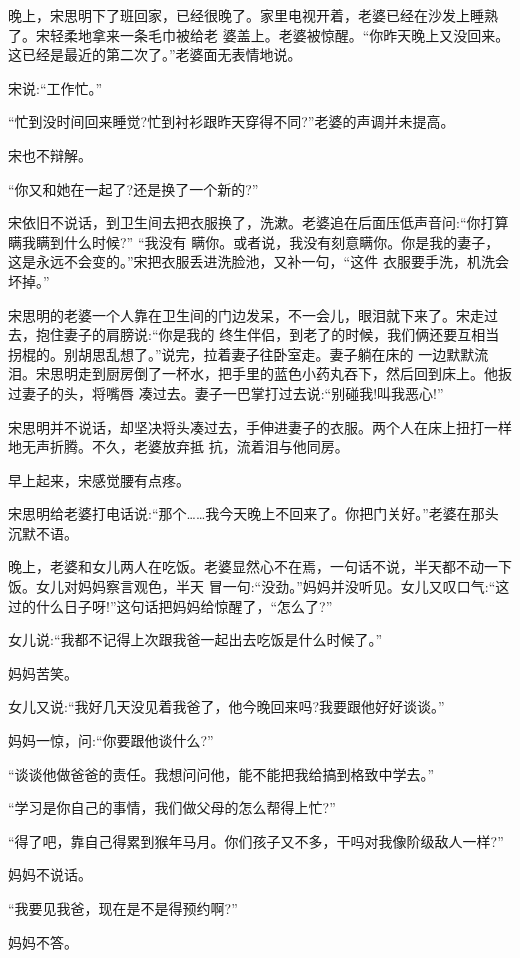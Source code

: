 \documentclass[11pt,a4paper,onecolumn]{article}
\begin{document}
晚上，宋思明下了班回家，已经很晚了。家里电视开着，老婆已经在沙发上睡熟了。宋轻柔地拿来一条毛巾被给老
婆盖上。老婆被惊醒。``你昨天晚上又没回来。这已经是最近的第二次了。''老婆面无表情地说。

宋说:``工作忙。''

``忙到没时间回来睡觉?忙到衬衫跟昨天穿得不同?''老婆的声调并未提高。

宋也不辩解。

``你又和她在一起了?还是换了一个新的?''

宋依旧不说话，到卫生间去把衣服换了，洗漱。老婆追在后面压低声音问:``你打算瞒我瞒到什么时候?'' ``我没有
瞒你。或者说，我没有刻意瞒你。你是我的妻子，这是永远不会变的。''宋把衣服丢进洗脸池，又补一句，``这件
衣服要手洗，机洗会坏掉。''

宋思明的老婆一个人靠在卫生间的门边发呆，不一会儿，眼泪就下来了。宋走过去，抱住妻子的肩膀说:``你是我的
终生伴侣，到老了的时候，我们俩还要互相当拐棍的。别胡思乱想了。''说完，拉着妻子往卧室走。妻子躺在床的
一边默默流泪。宋思明走到厨房倒了一杯水，把手里的蓝色小药丸吞下，然后回到床上。他扳过妻子的头，将嘴唇
凑过去。妻子一巴掌打过去说:``别碰我!叫我恶心!''

宋思明并不说话，却坚决将头凑过去，手伸进妻子的衣服。两个人在床上扭打一样地无声折腾。不久，老婆放弃抵
抗，流着泪与他同房。

早上起来，宋感觉腰有点疼。

宋思明给老婆打电话说:``那个……我今天晚上不回来了。你把门关好。''老婆在那头沉默不语。

晚上，老婆和女儿两人在吃饭。老婆显然心不在焉，一句话不说，半天都不动一下饭。女儿对妈妈察言观色，半天
冒一句:``没劲。''妈妈并没听见。女儿又叹口气:``这过的什么日子呀!''这句话把妈妈给惊醒了，``怎么了?''

女儿说:``我都不记得上次跟我爸一起出去吃饭是什么时候了。''

妈妈苦笑。

女儿又说:``我好几天没见着我爸了，他今晚回来吗?我要跟他好好谈谈。''

妈妈一惊，问:``你要跟他谈什么?''

``谈谈他做爸爸的责任。我想问问他，能不能把我给搞到格致中学去。''

``学习是你自己的事情，我们做父母的怎么帮得上忙?''

``得了吧，靠自己得累到猴年马月。你们孩子又不多，干吗对我像阶级敌人一样?''

妈妈不说话。

``我要见我爸，现在是不是得预约啊?''

妈妈不答。
\end{document}
